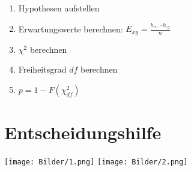 \documentclass[10pt,a4paper,landscape]{article}
\begin{document}
\begin{multicols}{4}
\begin{enumerate}
\item Hypothesen aufstellen
\item Erwartungswerte berechnen: $E_{xy}=\frac{h_{x \cdot} \cdot h_{\cdot y}}{n}$
\item $\chi^2$ berechnen
\item Freiheitsgrad $df$ berechnen
\item $p = 1 - F(\chi^2_{df})$
\end{enumerate}


\section{Entscheidungshilfe}
\texttt{[image: Bilder/1.png]} 
\texttt{[image: Bilder/2.png]} 

\end{multicols}
\end{document}
